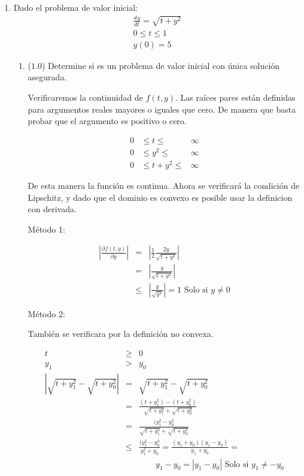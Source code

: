 \documentclass[12pt]{article}
\newcommand{\diff}[3]{\frac{d^{#3} #1}{d#2^{#3}}}
\newcommand{\pdiff}[3]{\frac{\partial^{#3} #1}{\partial #2^{#3}}}
\newcommand{\abs}[1]{\left| #1 \right|}
\begin{document}
  \begin{enumerate}[leftmargin=*,widest=9]

    \item Dado el problema de valor inicial:
    \begin{eqnarray*}
    \diff{y}{t}{} = \sqrt{t+y^2} \\
    0 \leq t \leq 1\\
    y(0) = 5
\end{eqnarray*}

    \begin{enumerate}[label=\alph*]
    \item (\(1.0\)) Determine si es un problema de valor inicial con única solución asegurada.


   Verificaremos la continuidad de \(f(t,y)\). Las raíces pares están definidas para argumentos reales mayores o iguales que cero. De manera que basta probar que el argumento es positivo o cero.

   \begin{equation}
   \begin{matrix}
   0 & \leq t \leq & \infty\\
   0 & \leq y^2 \leq & \infty\\
   \hline
   0 & \leq t + y^2 \leq & \infty
   \end{matrix}
   \end{equation}

   De esta manera la función es continua. Ahora se verificará la condición de Lipschitz, y dado que el dominio es convexo es posible usar la definicion con derivada.

   Método 1:

   \begin{eqnarray*}
   \abs{\pdiff{f(t, y)}{y}{}} & = & \abs{\frac{1}{2}\frac{2y}{\sqrt{t+y^2}}} \\
   & = & \abs{\frac{y}{\sqrt{t+y^2}}} \\
   & \leq & \abs{\frac{y}{\sqrt{y^2}}} = 1 \text{  Solo si $y \neq 0$}
   \end{eqnarray*}

   Método 2:

   También se verificara por la definición no convexa.

   \begin{eqnarray*}
   t & \geq & 0\\
   y_1 & > & y_0\\
   \abs{\sqrt{t+y_1^2} - \sqrt{t+y_0^2}} &=& \sqrt{t+y_1^2} - \sqrt{t+y_0^2}\\
   & = & \frac{(t+y_1^2)-(t+y_0^2)}{\sqrt{t+y_1^2}+\sqrt{t+y_0^2}}\\
   & = & \frac{(y_1^2-y_0^2}{\sqrt{t+y_1^2}+\sqrt{t+y_0^2}}\\
   & \leq & \frac{(y_1^2-y_0^2}{y_1^2+y_0} = \frac{(y_1+y_0)(y_1-y_0)}{y_1+y_0} = \\
   & & \qquad y_1 - y_0 = \abs{y_1 - y_0} \text{  Solo si \(y_1 \neq -y_0\)}
   \end{eqnarray*}


\end{enumerate}
\end{enumerate}
\end{document}
